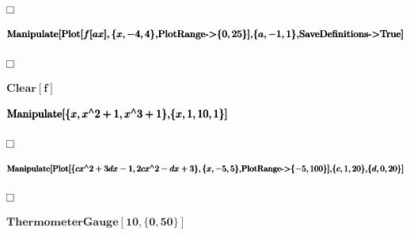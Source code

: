 \documentclass{article}
\begin{document}
\begin{doublespace}
\noindent\(\fbox{$$}\)
\end{doublespace}

\begin{doublespace}
\noindent\(\pmb{\text{Manipulate}[}\\
\pmb{\text{Plot}[f[a x],\{x,-4,4\},}\\
\pmb{\text{PlotRange}\text{-$>$}\{0,25\}],}\\
\pmb{\{a,-1,1\},}\\
\pmb{\text{SaveDefinitions}\text{-$>$}\text{True}]}\)
\end{doublespace}

\begin{doublespace}
\noindent\(\fbox{$$}\)
\end{doublespace}

\begin{doublespace}
\noindent\(\pmb{\text{Clear}[f]}\)
\end{doublespace}

\begin{doublespace}
\noindent\(\pmb{\text{Manipulate}[}\\
\pmb{\{x,x{}^{\wedge}2+1,x{}^{\wedge}3+1\},}\\
\pmb{\{x,1,10,1\}]}\)
\end{doublespace}

\begin{doublespace}
\noindent\(\fbox{$$}\)
\end{doublespace}

\begin{doublespace}
\noindent\(\pmb{\text{Manipulate}[}\\
\pmb{\text{Plot}[\{c x{}^{\wedge}2+3d x-1,2c x{}^{\wedge}2-d x+3\},\{x,-5,5\},}\\
\pmb{\text{PlotRange}\text{-$>$}\{-5,100\}],}\\
\pmb{\{c,1,20\},}\\
\pmb{\{d,0,20\}]}\)
\end{doublespace}

\begin{doublespace}
\noindent\(\fbox{$$}\)
\end{doublespace}

\begin{doublespace}
\noindent\(\pmb{\text{ThermometerGauge}[10,\{0,50\}]}\)
\end{doublespace}
\end{document}
